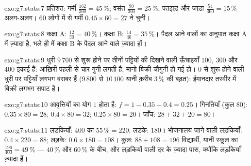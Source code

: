 \begin{solution}{exo:g7:stats:7}
प्रतिशत: गर्मी $\frac{162}{360} = 45\,\%$; वसंत
$\frac{90}{360} = 25\,\%$; पतझड़ और जाड़ा $\frac{54}{360} = 15\,\%$
अलग-अलग। $60$ लोगों में से गर्मी $0.45 \times 60 = 27$ ने चुनी।
\end{solution}

\begin{solution}{exo:g7:stats:8}
कक्षा A: $\frac{12}{30} = 40\,\%$। कक्षा B:
$\frac{14}{40} = 35\,\%$। पैदल आने वालों का अनुपात कक्षा A में
ज़्यादा है, भले ही  में कक्षा B के पैदल आने वाले ज़्यादा हों।
\end{solution}

\begin{solution}{exo:g7:stats:9}
धुरी $9\,700$ से शुरू होने पर तीनों पट्टियों की दिखने वाली
ऊँचाइयाँ $100$, $300$ और $400$ इकाई हैं: आख़िरी पहली से चार गुनी
लगती है, मानो बिक्री चौगुनी हो गई हो। $0$ से शुरू होने वाली धुरी
पर पट्टियाँ लगभग बराबर हैं ($9\,800$ से $10\,100$ यानी क़रीब
$3\,\%$ की बढ़त): ईमानदार तस्वीर में बिक्री लगभग सपाट है।
\end{solution}

\begin{solution}{exo:g7:stats:10}
आवृत्तियों का योग $1$ होता है: $f = 1 - 0.35 - 0.4 = 0.25$।
गिनतियाँ (कुल $80$): $0.35 \times 80 = 28$; $0.4 \times 80 = 32$;
$0.25 \times 80 = 20$। जाँच: $28 + 32 + 20 = 80$।
\end{solution}

\begin{solution}{exo:g7:stats:11}
लड़कियाँ: $400$ का $55\,\% = 220$; लड़के: $180$। भोजनालय जाने
वाली लड़कियाँ: $0.4 \times 220 = 88$; लड़के:
$0.6 \times 180 = 108$। कुल: $88 + 108 = 196$ विद्यार्थी, यानी
स्कूल का $\frac{196}{400} = 49\,\%$ --- $40\,\%$ और $60\,\%$ के
बीच, और लड़कियों वाली दर के ज़्यादा पास, क्योंकि लड़कियाँ
ज़्यादा हैं।
\end{solution}

